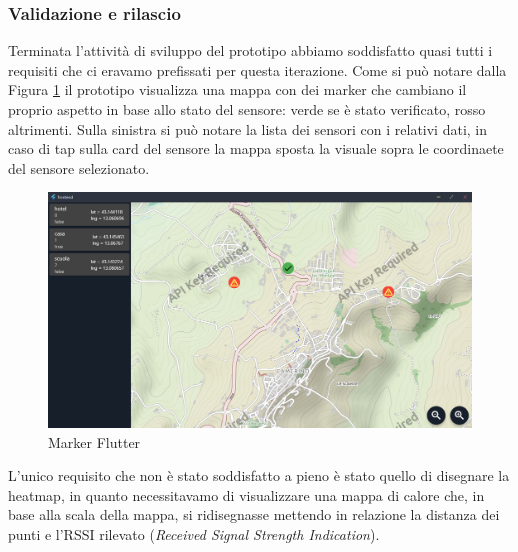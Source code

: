 \documentclass[a4paper]{report}
\begin{document}
\subsubsection*{{Validazione e rilascio}}
Terminata l'attività di sviluppo del prototipo abbiamo soddisfatto quasi tutti i requisiti che ci eravamo prefissati per questa iterazione. Come si può notare dalla Figura \ref{marker_flutter} il prototipo visualizza una mappa con dei marker che cambiano il proprio aspetto in base allo stato del sensore: verde se è stato verificato, rosso altrimenti. Sulla sinistra si può notare la lista dei sensori con i relativi dati, in caso di tap sulla card del sensore la mappa sposta la visuale sopra le coordinaete del sensore selezionato. 
\begin{figure}[tbp]
    \centering
    \includegraphics[width=\textwidth]{figure/marker_flutter.png}
    \caption{Marker Flutter}
    \label{marker_flutter}
\end{figure}

L'unico requisito che non è stato soddisfatto a pieno è stato quello di disegnare la heatmap, in quanto necessitavamo di visualizzare una mappa di calore che, in base alla scala della mappa, si ridisegnasse mettendo in relazione la distanza dei punti e l'RSSI rilevato (\textit{Received Signal Strength Indication}).
\end{document}
